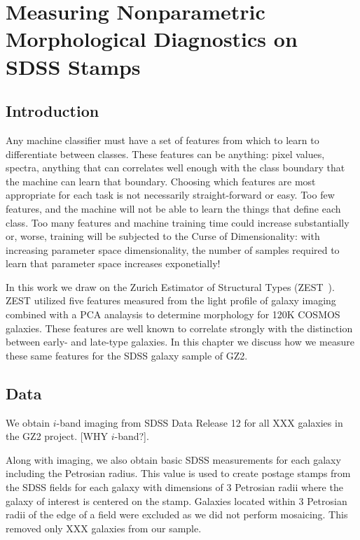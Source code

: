 
\chapter{Measuring Nonparametric Morphological Diagnostics on SDSS Stamps}
\label{chap:3}


\section{Introduction}
Any machine classifier must have a set of features from which to learn to differentiate between classes. These features can be anything: pixel values, spectra, anything that can correlates well enough with the class boundary that the machine can learn that boundary. Choosing which features are most appropriate for each task is not necessarily straight-forward or easy. Too few features, and the machine will not be able to learn the things that define each class. Too many features and machine training time could increase substantially or, worse, training will be subjected to the Curse of Dimensionality: with increasing parameter space dimensionality, the number of samples required to learn that parameter space increases exponetially! 

In this work we draw on the Zurich Estimator of Structural Types (ZEST~\citep{Scarlata2007}). ZEST utilized five features measured from the light profile of galaxy imaging combined with a PCA analaysis to determine morphology for 120K COSMOS galaxies. These features are well known to correlate strongly with the distinction between early- and late-type galaxies. In this chapter we discuss how we measure these same features for the SDSS galaxy sample of GZ2. 

\section{Data}
We obtain $i$-band imaging from SDSS Data Release 12 for all XXX galaxies in the GZ2 project. [WHY $i$-band?]. 

Along with imaging, we also obtain basic SDSS measurements for each galaxy including the Petrosian radius. This value is used to create postage stamps from the SDSS fields for each galaxy with dimensions of 3 Petrosian radii where the galaxy of interest is centered on the stamp. Galaxies located within 3 Petrosian radii of the edge of a field were excluded as we did not perform mosaicing. This removed only XXX galaxies from our sample.

